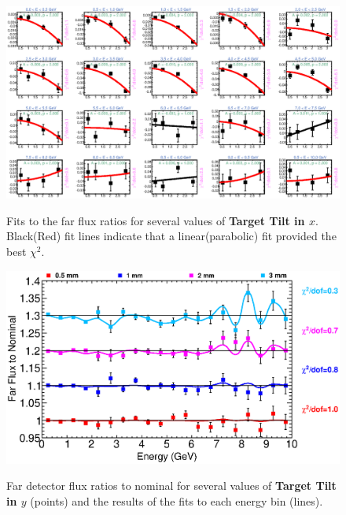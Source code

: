 \begin{figure}[ht]
  \begin{center}
    {\includegraphics[width=5.0in]{figures/TargetXTilt_far_fits.eps}}
  \end{center}
\caption{ Fits to the far flux ratios for several values of {\bf Target Tilt in $x$}. Black(Red) fit lines indicate that a linear(parabolic) fit provided the best $\chi^2$. }
\end{figure}

\clearpage

\begin{figure}[ht]
  \begin{center}
    {\includegraphics[width=6.0in]{figures/TargetYTilt_far_summary.eps}}
  \end{center}
\caption{ Far detector flux ratios to nominal for several values of {\bf Target Tilt in $y$} (points) and the results of the fits to each energy bin (lines).}
\end{figure}

